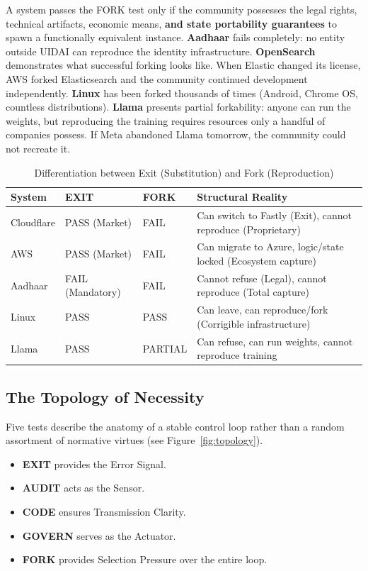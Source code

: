 \documentclass{article}
\begin{document}
A system passes the FORK test only if the community possesses the legal rights, technical artifacts, economic means, \textbf{and state portability guarantees} to spawn a functionally equivalent instance. \textbf{Aadhaar} fails completely: no entity outside UIDAI can reproduce the identity infrastructure. \textbf{OpenSearch} demonstrates what successful forking looks like. When Elastic changed its license, AWS forked Elasticsearch and the community continued development independently. \textbf{Linux} has been forked thousands of times (Android, Chrome OS, countless distributions). \textbf{Llama} presents partial forkability: anyone can run the weights, but reproducing the training requires resources only a handful of companies possess. If Meta abandoned Llama tomorrow, the community could not recreate it.

\begin{table}[htbp]
\centering
\begin{tabular}{@{}llll@{}}
\toprule
\textbf{System} & \textbf{EXIT} & \textbf{FORK} & \textbf{Structural Reality} \\
\midrule
Cloudflare & PASS (Market) & FAIL & Can switch to Fastly (Exit), cannot reproduce (Proprietary) \\
AWS & PASS (Market) & FAIL & Can migrate to Azure, logic/state locked (Ecosystem capture) \\
Aadhaar & FAIL (Mandatory) & FAIL & Cannot refuse (Legal), cannot reproduce (Total capture) \\
Linux & PASS & PASS & Can leave, can reproduce/fork (Corrigible infrastructure) \\
Llama & PASS & PARTIAL & Can refuse, can run weights, cannot reproduce training \\
\bottomrule
\end{tabular}
\caption{Differentiation between Exit (Substitution) and Fork (Reproduction)}
\end{table}

\subsection{The Topology of Necessity}

Five tests describe the anatomy of a stable control loop rather than a random assortment of normative virtues (see Figure~\ref{fig:topology}).

\begin{itemize}[noitemsep,topsep=0pt]
    \item \textbf{EXIT} provides the Error Signal.
    \item \textbf{AUDIT} acts as the Sensor.
    \item \textbf{CODE} ensures Transmission Clarity.
    \item \textbf{GOVERN} serves as the Actuator.
    \item \textbf{FORK} provides Selection Pressure over the entire loop.
\end{itemize}
\end{document}
